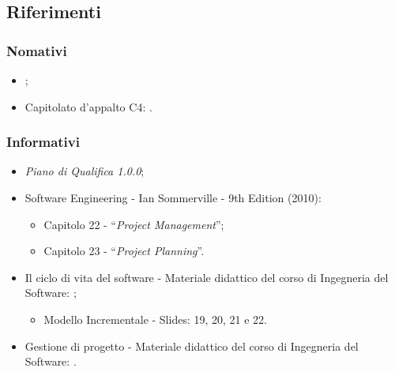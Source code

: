 \subsection{Riferimenti}
\subsubsection{Nomativi}
\begin{itemize}
    \item \NdP;
    \item Capitolato\glo{} d'appalto C4: \newline {}.
\end{itemize}

\subsubsection{Informativi}
\begin{itemize}
    \item \textit{Piano di Qualifica 1.0.0};
    \item Software Engineering - Ian Sommerville - 9th Edition (2010):
        \begin{itemize}
            \item Capitolo 22 - “\textit{Project Management}”;
            \item Capitolo 23 - “\textit{Project Planning}”.
        \end{itemize}
    \item Il ciclo di vita del software - Materiale didattico del corso di Ingegneria del Software: \newline {};
        \begin{itemize}
            \item Modello Incrementale - Slides: 19, 20, 21 e 22.
        \end{itemize}
    \item Gestione di progetto - Materiale didattico del corso di Ingegneria del Software: \newline {}.
\end{itemize}



